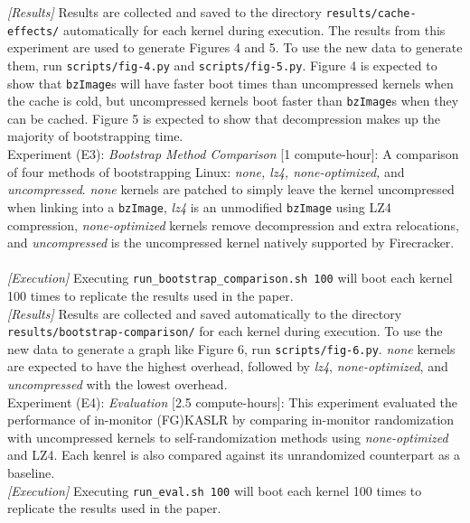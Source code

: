 \documentclass[sigplan,twocolumn]{acmart}
\begin{document}
{\textit{[Results]}
Results are collected and saved to the directory \texttt{results/cache-effects/} automatically for each kernel during execution. The results from
this experiment are used to generate Figures 4 and 5. To use the new data to generate 
them, run \texttt{scripts/fig-4.py} and \texttt{scripts/fig-5.py}. Figure 4 is expected to show that \texttt{bzImage}s will 
have faster boot times than uncompressed kernels when the cache is cold, but uncompressed kernels
boot faster than \texttt{bzImage}s when they can be cached. Figure 5 is expected to show that
decompression makes up the majority of bootstrapping time.
~\\

Experiment (E3): \textit{Bootstrap Method Comparison} [1 compute-hour]: 
A comparison of four methods of bootstrapping Linux: \textit{none,
lz4, none-optimized,} and \textit{uncompressed}. \textit{none} kernels
are patched to simply leave the kernel uncompressed when linking into a \texttt{bzImage}, \textit{lz4}
is an unmodified \texttt{bzImage} using LZ4 compression, \textit{none-optimized} kernels remove decompression
and extra relocations, and \textit{uncompressed} is the uncompressed kernel natively supported by Firecracker.
~\\

\textit{[Execution]}
Executing \texttt{run\_bootstrap\_comparison.sh 100} will
boot each kernel 100 times to replicate the results used in the paper.
\\

\textit{[Results]}
Results are collected and saved automatically to the directory \texttt{results/bootstrap-comparison/} for each kernel during execution. To use the new data to generate 
a graph like Figure 6, run \texttt{scripts/fig-6.py}. \textit{none} kernels are expected to have the highest overhead,
followed by \textit{lz4}, \textit{none-optimized}, and \textit{uncompressed} with the lowest overhead. 
~\\

Experiment (E4): \textit{Evaluation} [2.5 compute-hours]: 
This experiment evaluated the performance of in-monitor (FG)KASLR by comparing in-monitor randomization with uncompressed 
kernels to self-randomization methods using \textit{none-optimized} and LZ4. Each kenrel is also compared against 
its unrandomized counterpart as a baseline.
~\\

\textit{[Execution]}
Executing \texttt{run\_eval.sh 100} will
boot each kernel 100 times to replicate the results used in the paper.
\\

}
\end{document}
